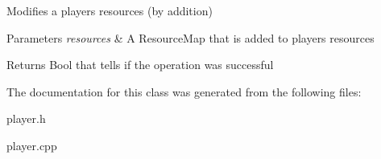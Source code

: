 Modifies a players resources (by addition) 


\begin{DoxyParams}{Parameters}
{\em resources} & A Resource\-Map that is added to players resources \\
\hline
\end{DoxyParams}
\begin{DoxyReturn}{Returns}
Bool that tells if the operation was successful 
\end{DoxyReturn}


The documentation for this class was generated from the following files\-:\begin{DoxyCompactItemize}
\item 
player.\-h\item 
player.\-cpp\end{DoxyCompactItemize}
